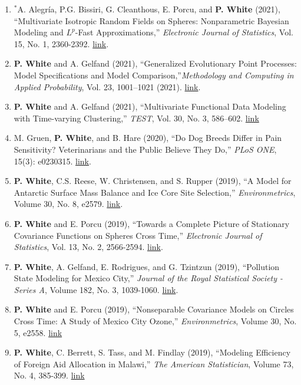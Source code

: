 \documentclass[11pt]{article}
\begin{document}
\begin{enumerate}[label=$\bullet$]
\item $^*$A. Alegr\'ia, P.G. Bissiri, G. Cleanthous, E. Porcu, and \textbf{P. White} (2021), ``Multivariate Isotropic Random  Fields on Spheres: Nonparametric Bayesian Modeling and $L^p$-Fast Approximations,'' \emph{Electronic Journal of Statistics}, Vol. 15, No. 1,  2360-2392. \href{https://doi.org/10.1214/19-EJS1593}{link}.
\item \textbf{P. White} and A. Gelfand (2021), ``Generalized Evolutionary Point Processes: Model Specifications and Model Comparison,''\emph{Methodology and Computing in Applied Probability}, Vol. 23, 1001–1021 (2021). \href{https://doi.org/10.1007/s11009-020-09797-8}{link}.
\item \textbf{P. White} and A. Gelfand (2021), ``Multivariate Functional Data Modeling with Time-varying Clustering,'' \textit{TEST}, Vol. 30, No. 3, 586–602. \href{http://link.springer.com/article/10.1007/s11749-020-00733-z}{link}
\item M. Gruen, \textbf{P. White}, and B. Hare (2020), ``Do Dog Breeds Differ in Pain Sensitivity? Veterinarians and the Public Believe They Do,'' \emph{PLoS ONE}, 15(3): e0230315. \href{https://doi.org/10.1371/journal.pone.0230315}{link}.
\item \textbf{P. White}, C.S. Reese, W. Christensen, and S. Rupper (2019), ``A Model for Antarctic Surface Mass Balance and Ice Core Site Selection,'' \emph{Environmetrics}, Volume 30, No. 8, e2579. \href{https://onlinelibrary.wiley.com/doi/abs/10.1002/env.2579}{link}.
\item \textbf{P. White} and E. Porcu (2019), ``Towards a Complete Picture of Stationary Covariance Functions on Spheres Cross Time,'' \emph{Electronic Journal of Statistics}, Vol. 13, No. 2, 2566-2594. \href{https://doi.org/10.1214/19-EJS1593}{link}.
\item \textbf{P. White}, A. Gelfand, E. Rodrigues, and G. Tzintzun (2019), ``Pollution State Modeling for Mexico City,'' \emph{Journal of the Royal Statistical Society - Series A}, Volume 182, No. 3, 1039-1060. \href{https://rss.onlinelibrary.wiley.com/doi/abs/10.1111/rssa.12444}{link}.
\item \textbf{P. White} and E. Porcu (2019), ``Nonseparable Covariance Models on Circles Cross Time: A Study of Mexico City Ozone,'' \emph{Environmetrics}, Volume 30, No. 5, e2558. \href{https://onlinelibrary.wiley.com/doi/full/10.1002/env.2558}{link}
\item \textbf{P. White}, C. Berrett, S. Tass, and M. Findlay (2019), ``Modeling Efficiency of Foreign Aid Allocation in Malawi,'' \emph{The American Statistician}, Volume 73, No. 4, 385-399.  \href{https://www.tandfonline.com/doi/full/10.1080/00031305.2018.1470032}{link}

\end{enumerate}
\end{document}
